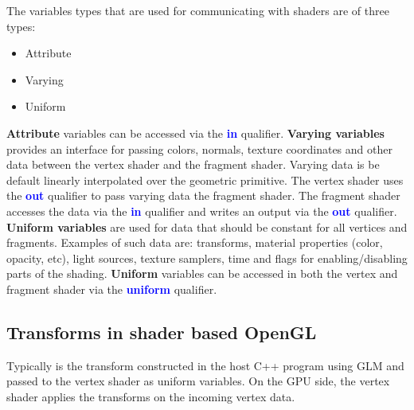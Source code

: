 The variables types that are used for communicating with shaders are of three types:

\begin{itemize}
	\item Attribute
	\item Varying
	\item Uniform
\end{itemize}

\textbf{Attribute} variables can be accessed via the \textcolor{blue}{\textbf{in}} qualifier. \textbf{Varying variables} provides an interface for passing colors, normals, texture coordinates and other data between the vertex shader and the fragment shader. Varying data is be default linearly interpolated over the geometric primitive. The vertex shader uses the \textcolor{blue}{\textbf{out}} qualifier to pass varying data the fragment shader. The fragment shader accesses the data via the \textcolor{blue}{\textbf{in}} qualifier and writes an output via the \textcolor{blue}{\textbf{out}} qualifier. \textbf{Uniform variables} are used for data that should be constant for all vertices and fragments. Examples of such data are: transforms, material properties (color, opacity, etc), light sources, texture samplers, time and flags for enabling/disabling parts of the shading. \textbf{Uniform} variables can be accessed in both the vertex and fragment shader via the \textcolor{blue}{\textbf{uniform}} qualifier. 

\subsection*{Transforms in shader based OpenGL}
Typically is the transform constructed in the host C++ program using GLM and passed to the vertex shader as uniform variables. On the GPU side, the vertex shader applies the transforms on the incoming vertex data. 


